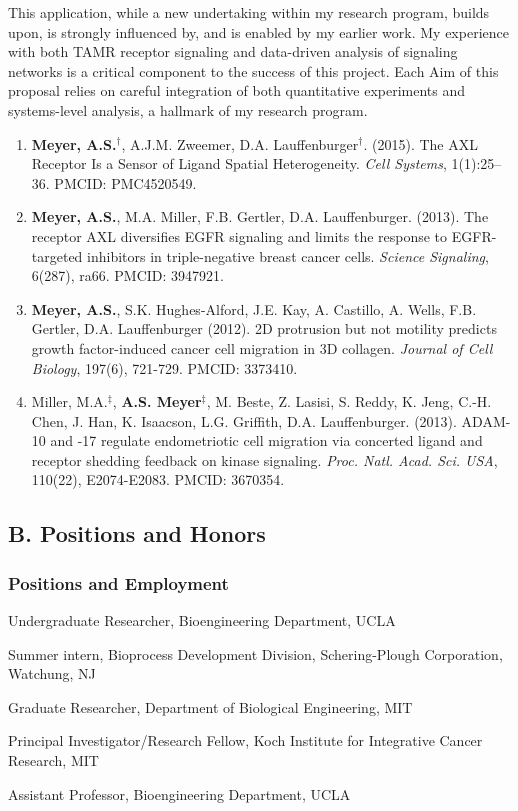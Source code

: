\documentclass[11pt]{article}
\begin{document}
This application, while a new undertaking within my research program, builds upon, is strongly influenced by, and is enabled by my earlier work. My experience with both TAMR receptor signaling and data-driven analysis of signaling networks is a critical component to the success of this project. Each Aim of this proposal relies on careful integration of both quantitative experiments and systems-level analysis, a hallmark of my research program.

\begin{enumerate}
  \item \textbf{Meyer, A.S.}$^\dag$, A.J.M. Zweemer, D.A. Lauffenburger$^\dag$. (2015). The AXL Receptor Is a Sensor of Ligand Spatial Heterogeneity. \emph{Cell Systems}, 1(1):25--36. PMCID: PMC4520549.
  \item \textbf{Meyer, A.S.}, M.A. Miller, F.B. Gertler, D.A. Lauffenburger. (2013). The receptor AXL diversifies EGFR signaling and limits the response to EGFR-targeted inhibitors in triple-negative breast cancer cells. \emph{Science Signaling}, 6(287), ra66. PMCID: 3947921.
  \item \textbf{Meyer, A.S.}, S.K. Hughes-Alford, J.E. Kay, A. Castillo, A. Wells, F.B. Gertler, D.A. Lauffenburger (2012). 2D protrusion but not motility predicts growth factor-induced cancer cell migration in 3D collagen. \emph{Journal of Cell Biology}, 197(6), 721-729. PMCID: 3373410.
  \item Miller, M.A.$^\ddag$, \textbf{A.S. Meyer}$^\ddag$, M. Beste, Z. Lasisi, S. Reddy, K. Jeng, C.-H. Chen, J. Han, K. Isaacson, L.G. Griffith, D.A. Lauffenburger. (2013). ADAM-10 and -17 regulate endometriotic cell migration via concerted ligand and receptor shedding feedback on kinase signaling. \emph{Proc. Natl. Acad. Sci. USA}, 110(22), E2074-E2083. PMCID: 3670354.
\end{enumerate}





\subsection{B. Positions and Honors}

\subsubsection{Positions and Employment}

\begin{description}[align=right, labelwidth=2.5cm, font=\normalfont]
\item[2006--2009] Undergraduate Researcher, Bioengineering Department, UCLA
\item[2008] Summer intern, Bioprocess Development Division, Schering-Plough Corporation, Watchung, NJ
\item[2009--2014] Graduate Researcher, Department of Biological Engineering, MIT
\item[2014--2017] Principal Investigator/Research Fellow, Koch Institute for Integrative Cancer Research, MIT
\item[2017--Present] Assistant Professor, Bioengineering Department, UCLA
\end{description}
\end{document}
